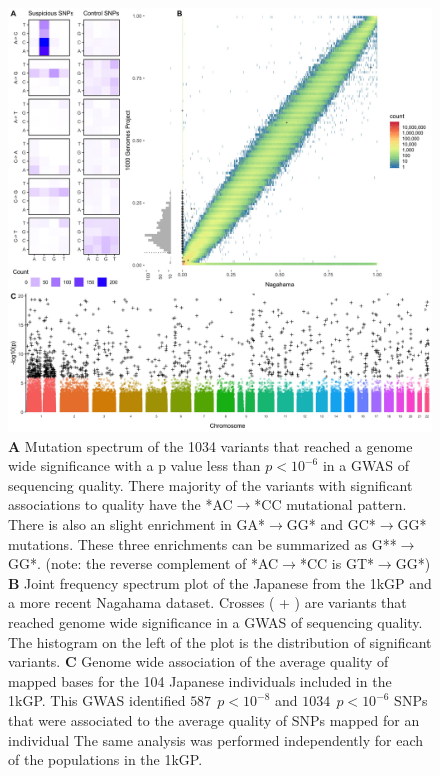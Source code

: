 \documentclass[9pt,lineno]{elife}
\begin{document}
\begin{figure}
\includegraphics[width=\hsize,keepaspectratio]{./Figures/Figure1.jpg}
\caption{
\textbf{A} 
Mutation spectrum of the 1034 variants that reached a genome wide significance with a p value less than $p < 10^{-6}$  in a GWAS of sequencing quality. 
There majority of the variants with significant associations to quality have the *AC${\rightarrow}$*CC mutational pattern. There is also an slight enrichment in GA*${\rightarrow}$GG* and GC*${\rightarrow}$GG* mutations. These three enrichments can be summarized as G**${\rightarrow}$GG*. (note: the reverse complement of *AC${\rightarrow}$*CC is GT*${\rightarrow}$GG*)
\textbf{B} 
Joint frequency spectrum plot of the Japanese from the 1kGP and a more recent Nagahama dataset.
Crosses ( + ) are variants that reached genome wide significance in a GWAS of sequencing quality. 
The histogram on the left of the plot is the distribution of significant variants. 
\textbf{C} 
Genome wide association of the average quality of mapped bases for the 104 Japanese individuals included in the 1kGP. This GWAS identified $587\ \  p < 10^{-8}$ and $1034\ \ p < 10^{-6}$ SNPs that were associated to the average quality of SNPs mapped for an individual
The same analysis was performed independently for each of the populations in the 1kGP. }
 \label{SFS}
\end{figure}
\end{document}
